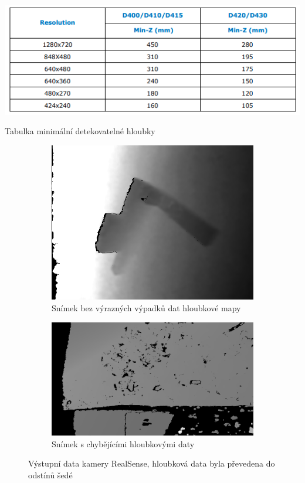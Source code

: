 \documentclass[twoside]{ctuthesis}
\begin{document}
\begin{table}
    \centering
    \includegraphics[width = 0.8\linewidth]{pictures/minimalni_vzdalenost.png}
    \caption{Tabulka minimální detekovatelné hloubky \cite{RealSense_datasheet}}
    \label{tab:minimalni_hloubka}
\end{table}


\begin{figure}[h]
\centering
\begin{subfigure}{0.48\textwidth}
  \centering
  \includegraphics[width=0.9\linewidth]{pictures/good_realsense.png}
  \caption{Snímek bez výrazných výpadků dat hloubkové mapy}
  \label{fig:rs_good}
\end{subfigure}
\begin{subfigure}{0.49\textwidth}
  \centering
  \includegraphics[width=0.9\linewidth]{pictures/bad_realsense.png}
  \caption{Snímek s chybějícími hloubkovými daty}
  \label{fig:rs_bad}
\end{subfigure}
\caption[Výstupní data kamery RealSense]{Výstupní data kamery RealSense, hloubková data byla převedena do odstínů šedé}
\label{fig:realsense_pics}
\end{figure}
\end{document}
